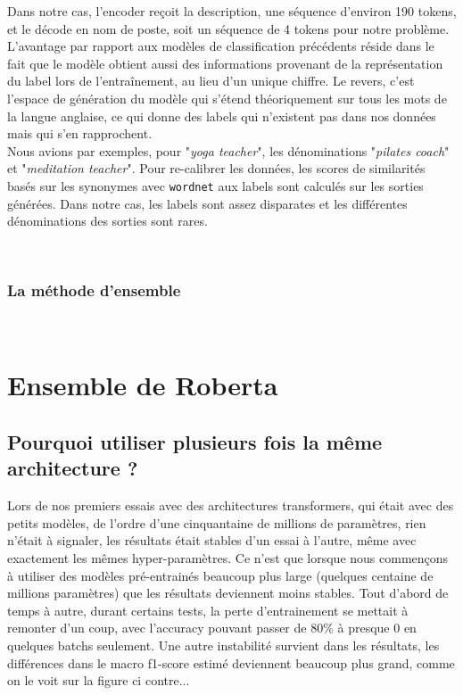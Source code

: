 Dans notre cas, l'encoder reçoit la description, une séquence d'environ 190 tokens, et le décode en nom de poste, soit un séquence de 4 tokens pour notre problème. L'avantage par rapport aux modèles de classification précédents réside dans le fait que le modèle obtient aussi des informations provenant de la représentation du label lors de l'entraînement, au lieu d'un unique chiffre.
Le revers, c'est l'espace de génération du modèle qui s'étend théoriquement sur tous les mots de la langue anglaise, ce qui donne des labels qui n'existent pas dans nos données mais qui s'en rapprochent.\\
Nous avions par exemples, pour "\textit{yoga teacher}", les dénominations "\textit{pilates coach}" et "\textit{meditation teacher}". Pour re-calibrer les données, les scores de similarités basés sur les synonymes avec \texttt{wordnet} aux labels sont calculés sur les sorties générées. Dans notre cas, les labels sont assez disparates et les différentes dénominations des sorties sont rares.

\hfill\\
\subsubsection{La méthode d'ensemble}
\hfill\\



\section{Ensemble de Roberta}
\subsection{Pourquoi utiliser plusieurs fois la même architecture ?}
Lors de nos premiers essais avec des architectures transformers, qui était avec des petits modèles, de l'ordre d'une cinquantaine de millions de paramètres, rien n'était à signaler, les résultats était stables d'un essai à l'autre, même avec exactement les mêmes hyper-paramètres. Ce n'est que lorsque nous commençons à utiliser des modèles pré-entrainés beaucoup plus large (quelques centaine de millions paramètres) que les résultats deviennent moins stables. Tout d'abord de temps à autre, durant certains tests, la perte d'entrainement se mettait à remonter d'un coup, avec l'accuracy pouvant passer de 80\% à presque 0 en quelques batchs seulement. Une autre instabilité survient dans les résultats, les différences dans le macro f1-score estimé deviennent beaucoup plus grand, comme on le voit sur la figure ci contre...


